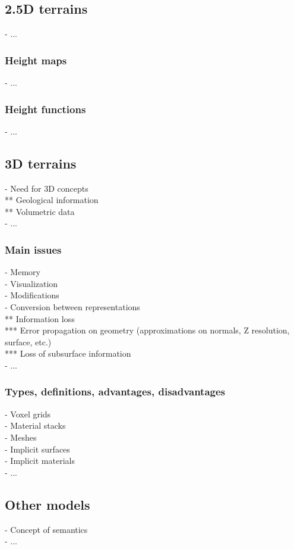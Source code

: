 \subsection{2.5D terrains}
- ...

\subsubsection{Height maps}
- ...

\subsubsection{Height functions}
- ...

\subsection{3D terrains}
- Need for 3D concepts \\
** Geological information \\
** Volumetric data \\
- ...

\subsubsection{Main issues}
- Memory \\
- Visualization \\
- Modifications \\
- Conversion between representations \\
** Information loss \\
*** Error propagation on geometry (approximations on normals, Z resolution, surface, etc.) \\
*** Loss of subsurface information \\
- ...

\subsubsection{Types, definitions, advantages, disadvantages}
- Voxel grids \\
- Material stacks \\
- Meshes \\
- Implicit surfaces \\
- Implicit materials \\
- ...

\subsection{Other models}
- Concept of semantics \\
- ...

